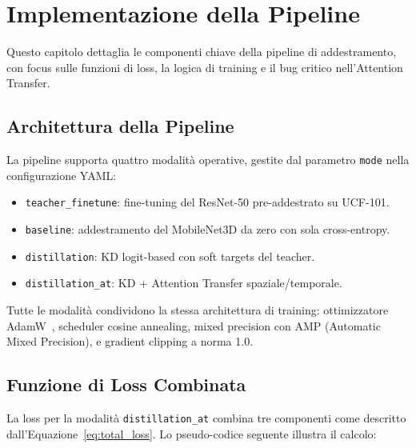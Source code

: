 \chapter{Implementazione della Pipeline}
\label{chap:implementazione}

Questo capitolo dettaglia le componenti chiave della pipeline di addestramento, con focus sulle funzioni di loss, la logica di training e il bug critico nell'Attention Transfer.

\section{Architettura della Pipeline}

La pipeline supporta quattro modalità operative, gestite dal parametro \texttt{mode} nella configurazione YAML:

\begin{itemize}
    \item \texttt{teacher\_finetune}: fine-tuning del ResNet-50 pre-addestrato su UCF-101.
    \item \texttt{baseline}: addestramento del MobileNet3D da zero con sola cross-entropy.
    \item \texttt{distillation}: KD logit-based con soft targets del teacher.
    \item \texttt{distillation\_at}: KD + Attention Transfer spaziale/temporale.
\end{itemize}

Tutte le modalità condividono la stessa architettura di training: ottimizzatore AdamW~\cite{loshchilov2019adamw}, scheduler cosine annealing, mixed precision con AMP (Automatic Mixed Precision), e gradient clipping a norma 1.0.

\section{Funzione di Loss Combinata}

La loss per la modalità \texttt{distillation\_at} combina tre componenti come descritto dall'Equazione~\ref{eq:total_loss}. Lo pseudo-codice seguente illustra il calcolo:

